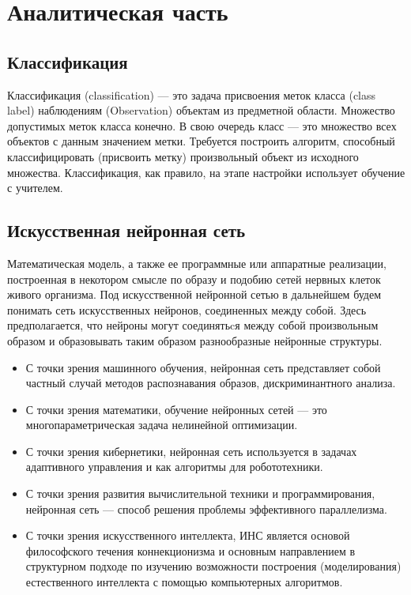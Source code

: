 \chapter{Аналитическая часть}

\section{Классификация}

Классификация (classification) — это задача присвоения меток класса
(class label) наблюдениям (Observation) объектам из предметной области.
Множество допустимых меток класса конечно. В свою очередь класс —
это множество всех объектов с данным значением метки. Требуется
построить алгоритм, способный классифицировать (присвоить метку)
произвольный объект из исходного множества. Классификация, как
правило, на этапе настройки использует обучение с учителем.

\section{Искусственная нейронная сеть}

Математическая модель, а также ее программные или аппаратные
реализации, построенная в некотором смысле по образу и подобию сетей
нервных клеток живого организма.
Под искусственной нейронной сетью в дальнейшем будем понимать сеть
искусственных нейронов, соединенных между собой. Здесь предполагается, что
нейроны могут соединятьcя между собой произвольным образом и
образовывать таким образом разнообразные нейронные структуры.

\begin{itemize}[label*=---]
	\item С точки зрения машинного обучения, нейронная сеть представляет собой
	частный случай методов распознавания образов, дискриминантного
	анализа.
	\item С точки зрения математики, обучение нейронных сетей --- это
	многопараметрическая задача нелинейной оптимизации.
	\item С точки зрения кибернетики, нейронная сеть используется в задачах
	адаптивного управления и как алгоритмы для робототехники.
	\item С точки зрения развития вычислительной техники и программирования,
	нейронная сеть --- способ решения проблемы эффективного параллелизма.
	\item С точки зрения искусственного интеллекта, ИНС является основой
	философского течения коннекционизма и основным направлением в
	структурном подходе по изучению возможности построения
	(моделирования) естественного интеллекта с помощью компьютерных
	алгоритмов.
\end{itemize}

